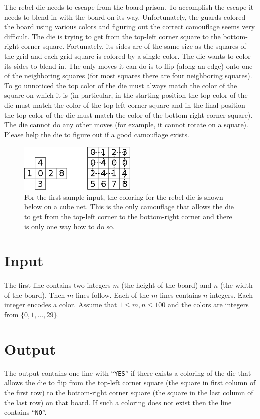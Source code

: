 
The rebel die needs to escape from the board prison. To accomplish the
escape it needs to blend in with the board on its way. Unfortunately,
the guards colored the board using various colors and figuring out the
correct camouflage seems very difficult. The die is trying to get from
the top-left corner square to the bottom-right corner
square. Fortunately, its sides are of the same size as the squares of
the grid and each grid square is colored by a single color. The die
wants to color its sides to blend in. The only moves it can do is to
flip (along an edge) onto one of the neighboring squares (for most
squares there are four neighboring squares). To go unnoticed the top
color of the die must always match the color of the square on which it
is (in particular, in the starting position the top color of the die
must match the color of the top-left corner square and in the final
position the top color of the die must match the color of the
bottom-right corner square). The die cannot do any other moves (for
example, it cannot rotate on a square). Please help the die to figure
out if a good camouflage exists.

\begin{figure}[h]
  \centering
  \includegraphics[width=0.5\textwidth]{rebeldie}
  \caption{For the first sample input, the coloring for the rebel die
    is shown below on a cube net. This is the only camouflage that
    allows the die to get from the top-left corner to the bottom-right
    corner and there is only one way how to do so.}
\label{fig:sample1}
\end{figure}

\section*{Input}

The first line contains two integers $m$
(the height of the board) and $n$ (the width of the board). Then $m$ lines
follow. Each of the $m$ lines contains $n$ integers. Each integer encodes
a color. Assume that $1 \leq m, n \leq 100$ and the colors are integers from
$\{0, 1, \ldots, 29\}$.

\section*{Output}

The output contains one line with ``\verb+YES+'' if there exists a
coloring of the die that allows the die to flip from the top-left
corner square (the square in first column of the first row) to the
bottom-right corner square (the square in the last column of the last
row) on that board. If such a coloring does not exist then the line
contains ``\verb+NO+''.
